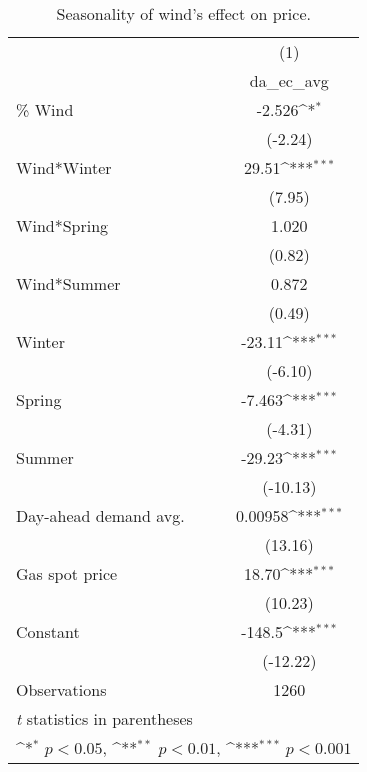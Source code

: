 \begin{table}[htbp]\centering
\def\sym#1{\ifmmode^{#1}\else\(^{#1}\)\fi}
\caption{Seasonality of wind's effect on price.\label{tab1}}
\begin{tabular}{l*{1}{c}}
\hline\hline
                    &\multicolumn{1}{c}{(1)}\\
                    &\multicolumn{1}{c}{da\_ec\_avg}\\
\hline
\% Wind              &      -2.526\sym{*}  \\
                    &     (-2.24)         \\
[1em]
Wind*Winter         &       29.51\sym{***}\\
                    &      (7.95)         \\
[1em]
Wind*Spring         &       1.020         \\
                    &      (0.82)         \\
[1em]
Wind*Summer         &       0.872         \\
                    &      (0.49)         \\
[1em]
Winter              &      -23.11\sym{***}\\
                    &     (-6.10)         \\
[1em]
Spring              &      -7.463\sym{***}\\
                    &     (-4.31)         \\
[1em]
Summer              &      -29.23\sym{***}\\
                    &    (-10.13)         \\
[1em]
Day-ahead demand avg.         &     0.00958\sym{***}\\
                    &     (13.16)         \\
[1em]
Gas spot price      &       18.70\sym{***}\\
                    &     (10.23)         \\
[1em]
Constant            &      -148.5\sym{***}\\
                    &    (-12.22)         \\
\hline
Observations        &        1260         \\
\hline\hline
\multicolumn{2}{l}{\footnotesize \textit{t} statistics in parentheses}\\
\multicolumn{2}{l}{\footnotesize \sym{*} \(p<0.05\), \sym{**} \(p<0.01\), \sym{***} \(p<0.001\)}\\
\end{tabular}
\end{table}
